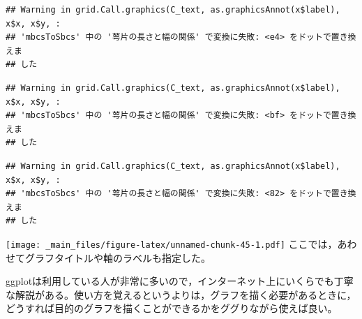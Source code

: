\documentclass[
]{book}
\begin{document}
\begin{verbatim}
## Warning in grid.Call.graphics(C_text, as.graphicsAnnot(x$label), x$x, x$y, :
## 'mbcsToSbcs' 中の '萼片の長さと幅の関係' で変換に失敗: <e4> をドットで置き換えま
## した
\end{verbatim}

\begin{verbatim}
## Warning in grid.Call.graphics(C_text, as.graphicsAnnot(x$label), x$x, x$y, :
## 'mbcsToSbcs' 中の '萼片の長さと幅の関係' で変換に失敗: <bf> をドットで置き換えま
## した
\end{verbatim}

\begin{verbatim}
## Warning in grid.Call.graphics(C_text, as.graphicsAnnot(x$label), x$x, x$y, :
## 'mbcsToSbcs' 中の '萼片の長さと幅の関係' で変換に失敗: <82> をドットで置き換えま
## した
\end{verbatim}

\texttt{[image: \_main\_files/figure-latex/unnamed-chunk-45-1.pdf]}
ここでは，あわせてグラフタイトルや軸のラベルも指定した。

ggplotは利用している人が非常に多いので，インターネット上にいくらでも丁寧な解説がある。使い方を覚えるというよりは，グラフを描く必要があるときに，どうすれば目的のグラフを描くことができるかをググりながら使えば良い。

  
\end{document}
